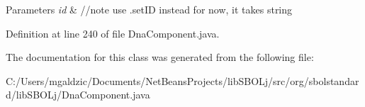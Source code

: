 \begin{DoxyParams}{Parameters}
{\em id} & //note use .setID instead for now, it takes string \\
\hline
\end{DoxyParams}


Definition at line 240 of file DnaComponent.java.



The documentation for this class was generated from the following file:\begin{DoxyCompactItemize}
\item 
C:/Users/mgaldzic/Documents/NetBeansProjects/libSBOLj/src/org/sbolstandard/libSBOLj/DnaComponent.java\end{DoxyCompactItemize}

